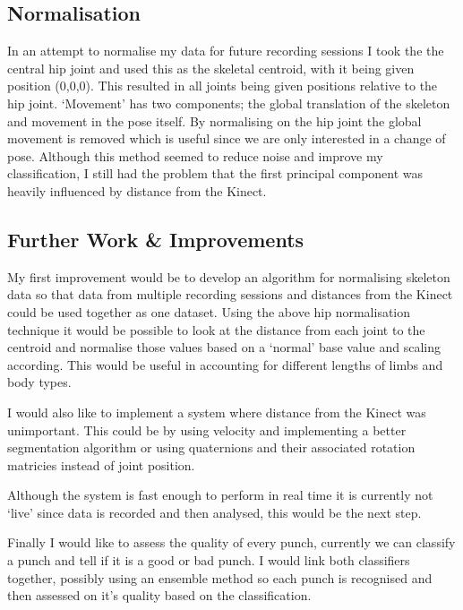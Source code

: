 \subsection{Normalisation}
In an attempt to normalise my data for future recording sessions I took the the central hip joint and used this as the skeletal centroid, with it being given position (0,0,0). This resulted in all joints being given positions relative to the hip joint. `Movement' has two components; the global translation of the skeleton and movement in the pose itself. By normalising on the hip joint the global movement is removed which is useful since we are only interested in a change of pose. Although this method seemed to reduce noise and improve my classification, I still had the problem that the first principal component was heavily influenced by distance from the Kinect.

\subsection{Further Work \& Improvements}
My first improvement would be to develop an algorithm for normalising skeleton data so that data from multiple recording sessions and distances from the Kinect could be used together as one dataset. Using the above hip normalisation technique it would be possible to look at the distance from each joint to the centroid and normalise those values based on a `normal' base value and scaling according. This would be useful in accounting for different lengths of limbs and body types. 

I would also like to implement a system where distance from the Kinect was unimportant. This could be by using velocity and implementing a better segmentation algorithm or using quaternions and their associated rotation matricies instead of joint position.

Although the system is fast enough to perform in real time it is currently not `live' since data is recorded and then analysed, this would be the next step. 

Finally I would like to assess the quality of every punch, currently we can classify a punch and tell if it is a good or bad punch. I would link both classifiers together, possibly using an ensemble method so each punch is recognised and then assessed on it's quality based on the classification.

